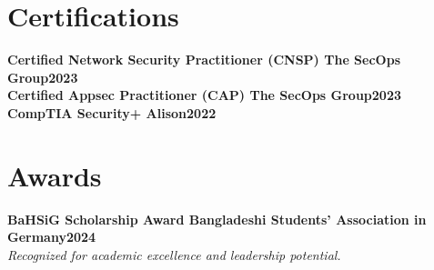 \documentclass[letterpaper,10pt]{article}
\newcommand{\heading}[2]{
  \hspace{10pt}#1\hfill#2\\
}
\newcommand{\headingBf}[2]{
  \heading{\textbf{#1}}{\textbf{#2}}
}
\newcommand{\headingIt}[2]{
  \heading{\textit{#1}}{\textit{#2}}
}
\begin{document}
\section{Certifications}

\headingBf{Certified Network Security Practitioner (CNSP) \textnormal{The SecOps Group}}{2023}
\headingBf{Certified Appsec Practitioner (CAP) \textnormal{The SecOps Group}}{2023}
\headingBf{CompTIA Security+ \textnormal{Alison}}{2022}

\section{Awards}

\headingBf{BaHSiG Scholarship Award \textnormal{Bangladeshi Students' Association in Germany}}{2024}
\headingIt{Recognized for academic excellence and leadership potential.}{}
\end{document}
